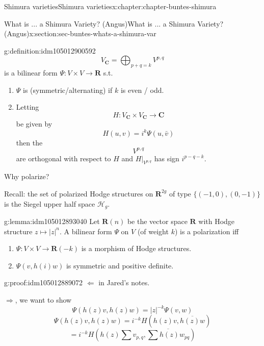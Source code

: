 \documentclass[oneside,10pt,]{book}
\numberwithin{equation}{section}
\newcommand{\RR}{\mathbf{R}}
\newcommand{\CC}{\mathbf{C}}
\begin{document}
\begin{chapterptx}{Shimura varieties}{}{Shimura varieties}{}{}{x:chapter:chapter-buntes-shimura}
\begin{sectionptx}{What is ... a Shimura Variety? (Angus)}{}{What is ... a Shimura Variety? (Angus)}{}{}{x:section:sec-buntes-whats-a-shimura-var}
\begin{definition}{}{g:definition:idm105012900592}
\begin{equation*}
V_\CC = \bigoplus_{p+q = k} V^{p,q}
\end{equation*}
is a bilinear form \(\Psi\colon V\times V \to \RR\) s.t.%
\begin{enumerate}
\item{}\(\Psi\) is (symmetric\slash{}alternating) if \(k\) is even \slash{} odd.%
\item{}Letting%
\begin{equation*}
H\colon V_\CC \times V_\CC \to \CC
\end{equation*}
be given by%
\begin{equation*}
H(u,v) = i^k \Psi(u, \bar v)
\end{equation*}
then the%
\begin{equation*}
V^{p,q}
\end{equation*}
are orthogonal with respect to \(H\) and \(H|_{V^{p,q}}\) has sign \(i^{p-q- k}\).%
\end{enumerate}
%
\end{definition}
Why polarize?%
\par
Recall: the set of polarized Hodge structures on \(\RR^{2g}\) of type \(\{(-1,0), (0,-1)\}\) is the Siegel upper half space \(\mathcal H_g\).%
\begin{lemma}{}{}{g:lemma:idm105012893040}%
Let \(\RR(n) \) be the vector space \(\RR\) with Hodge structure \(z\mapsto |z|^n\). A bilinear form \(\Psi\) on \(V\) (of weight \(k\)) is a polarization iff%
\begin{enumerate}
\item{}\(\Psi\colon V\times V \to \RR(-k)\) is a morphism of  Hodge structures.%
\item{}\(\Psi(v, h(i) w)\) is symmetric and positive definite.%
\end{enumerate}
%
\end{lemma}
\begin{proofptx}{}{g:proof:idm105012889072}
\(\Leftarrow\) in Jared's notes.%
\par
\(\Rightarrow\), we want to show%
\begin{equation*}
\Psi(h(z) v, h(z) w) = |z|^{-k} \Psi(v,w)
\end{equation*}
%
\begin{equation*}
\Psi(h(z) v, h(z) w) = i^{-k} H(h(z) v, \overline{h(z) w})
\end{equation*}
%
\begin{equation*}
=  i^{-k} H(h(z) \sum v_{p,q}, \overline { \sum h(z) w_{pq}})
\end{equation*}
%
\begin{equation*}

\end{equation*}
\end{proofptx}
\end{sectionptx}
\end{chapterptx}
\end{document}

